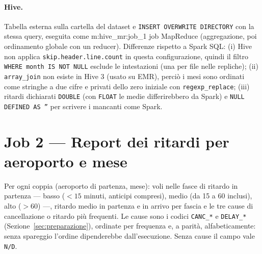 \documentclass[11pt,a4paper]{article}
\newcommand{\M}[1]{\csname m:#1\endcsname}
\newcommand{\code}[1]{\texttt{#1}}
\begin{document}
\paragraph{Hive.} Tabella esterna sulla cartella del dataset e \code{INSERT OVERWRITE DIRECTORY} con la stessa query,
eseguita come \M{hive_mr:job_1} job MapReduce (aggregazione, poi ordinamento globale con un reducer). Differenze
rispetto a Spark SQL: (i) Hive non applica \code{skip.header.line.count} in questa configurazione, quindi il filtro
\code{WHERE month IS NOT NULL} esclude le intestazioni (una per file nelle repliche); (ii) \code{array\_join} non
esiste in Hive 3 (usato su EMR), perciò i mesi sono ordinati come stringhe a due cifre e privati dello zero iniziale
con \code{regexp\_replace}; (iii) ritardi dichiarati \code{DOUBLE} (con \code{FLOAT} le medie differirebbero da
Spark) e \code{NULL DEFINED AS ''} per scrivere i mancanti come Spark.

\begin{table}[H]
\centering\scriptsize\setlength{\tabcolsep}{4pt}

\caption{Job 1: prime 10 righe sul dataset completo (\csname righe_output:job_1\endcsname{} righe in tutto), identiche
per le tre tecnologie. Ritardi in minuti.}
\label{tab:righe1}
\end{table}

\section{Job 2 --- Report dei ritardi per aeroporto e mese}\label{sec:job2}
Per ogni coppia (aeroporto di partenza, mese): voli nelle fasce di ritardo in partenza --- basso ($<15$ minuti,
anticipi compresi), medio (da 15 a 60 inclusi), alto ($>60$) ---, ritardo medio in partenza e in arrivo per fascia e
le tre cause di cancellazione o ritardo più frequenti. Le cause sono i codici \code{CANC\_*} e \code{DELAY\_*}
(Sezione~\ref{sec:preparazione}), ordinate per frequenza e, a parità, alfabeticamente: senza spareggio l'ordine
dipenderebbe dall'esecuzione. Senza cause il campo vale \code{N/D}.
\end{document}
